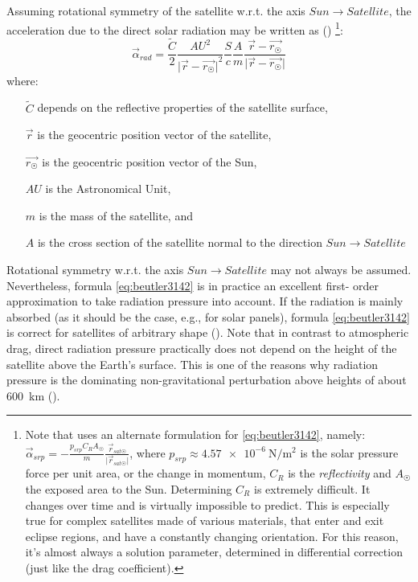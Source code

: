 Assuming rotational symmetry of the satellite w.r.t. the axis \(Sun \to Satellite\), 
the acceleration due to the direct solar radiation may be written as (\cite{BeutlerVII})
\footnote{Note that \cite{Vallado} uses an alternate formulation for \ref{eq:beutler3142}, 
namely: \( \vec{\alpha}_{srp} =  - \frac{p_{srp} C_R A_{\Sun}}{m} \frac{{\vec{r}}_{sat\Sun}}{\lvert {\vec{r}}_{sat\Sun} \rvert} \), 
where \(p_{srp} \approx \SI{4.57e-6}{\N\per\square\m}\) is the solar pressure force 
per unit area, or the change in momentum, \(C_R\) is the \emph{reflectivity} and 
\(A_{\Sun}\) the exposed area to the Sun. Determining \(C_R\) is extremely
difficult. It changes over time and is virtually impossible to predict. This is especially
true for complex satellites made of various materials, that enter and exit eclipse regions,
and have a constantly changing orientation. For this reason, it's almost always a solution
parameter, determined in differential correction (just like the drag coefficient).}:
\begin{equation}
    \label{eq:beutler3142}
    {\vec{\alpha}}_{rad} = \frac{\tilde{C}}{2} 
    \frac{{AU}^2}{{\lvert \vec{r} - \vec{r_{\Sun}} \rvert}^2}
    \frac{S}{c} \frac{A}{m}
    \frac{\vec{r} - \vec{r_{\Sun}}}{\lvert \vec{r} - \vec{r_{\Sun}} \rvert}
\end{equation}
where:
\begin{itemize}
\item[\(\tilde{C}\)] depends on the reﬂective properties of the satellite surface,
\item[\(\vec{r}\)] is the geocentric position vector of the satellite,
\item[\(\vec{r_{\Sun}}\)] is the geocentric position vector of the Sun,
\item[\(AU\)] is the Astronomical Unit,
\item[\(m\)] is the mass of the satellite, and
\item[\(A\)] is the cross section of the satellite normal to the direction \(Sun \to Satellite\)
\end{itemize}

Rotational symmetry w.r.t. the axis \(Sun \to Satellite\) may not always
be assumed. Nevertheless, formula \ref{eq:beutler3142} is in practice an excellent ﬁrst-
order approximation to take radiation pressure into account. If the radiation
is mainly absorbed (as it should be the case, e.g., for solar panels), formula 
\ref{eq:beutler3142} is correct for satellites of arbitrary shape (\cite{BeutlerVII}).
Note that in contrast to atmospheric drag, direct radiation pressure practically does 
not depend on the height of the satellite above the Earth's surface. This is one of 
the reasons why radiation pressure is the dominating non-gravitational perturbation 
above heights of about \SI{600}{\km} (\cite{BeutlerVII}).

